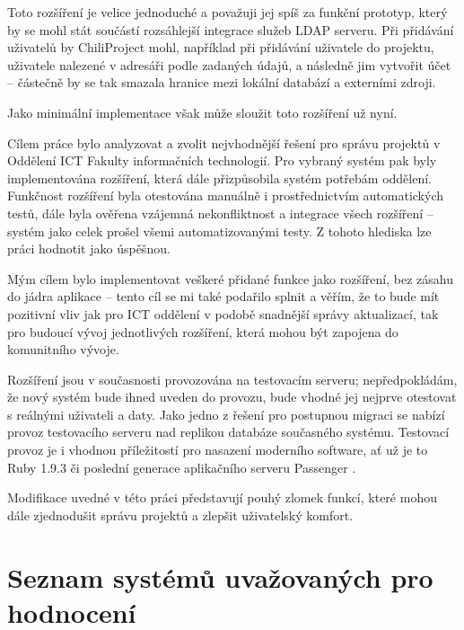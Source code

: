 \documentclass[thesis=B,czech]{FITthesis}[2012/05/02]
\begin{document}
Toto rozšíření je velice jednoduché a považuji jej spíš za funkční
prototyp, který by se mohl stát součástí rozsáhlejší integrace služeb
LDAP serveru. Při přidávání uživatelů by ChiliProject mohl, například
při přidávání uživatele do projektu,  uživatele nalezené
v adresáři podle zadaných údajů, a následně jim vytvořit účet -- částečně
by se tak smazala hranice mezi lokální databází a externími zdroji.

Jako minimální implementace však může sloužit toto rozšíření už nyní.

\begin{conclusion}

Cílem práce bylo analyzovat a zvolit nejvhodnější řešení pro správu projektů v Oddělení ICT Fakulty informačních technologií. Pro vybraný systém pak byly implementována rozšíření, která dále přizpůsobila systém potřebám oddělení. Funkčnost rozšíření byla otestována manuálně i prostřednictvím automatických testů, dále byla ověřena vzájemná nekonfliktnost a integrace všech rozšíření -- systém jako celek prošel všemi automatizovanými testy. Z tohoto hlediska lze práci hodnotit jako úspěšnou.

Mým cílem bylo implementovat veškeré přidané funkce jako rozšíření, bez zásahu do jádra aplikace -- tento cíl se mi také podařilo splnit a věřím, že to bude mít pozitivní vliv jak pro \gls{ICT} oddělení v podobě snadnější správy aktualizací, tak pro budoucí vývoj jednotlivých rozšíření, která mohou být zapojena do komunitního vývoje.

Rozšíření jsou v současnosti provozována na testovacím serveru; nepředpokládám, že nový systém bude ihned uveden do provozu, bude vhodné jej nejprve otestovat s reálnými uživateli a daty. Jako jedno z řešení pro postupnou migraci se nabízí provoz testovacího serveru nad replikou databáze současného systému. Testovací provoz je i vhodnou příležitostí pro nasazení moderního software, ať už je to Ruby 1.9.3 či poslední generace aplikačního serveru Passenger \citep{Passenger32}.

Modifikace uvedné v této práci představují pouhý zlomek funkcí, které mohou dále zjednodušit správu projektů a zlepšit uživatelský komfort.

\end{conclusion}




\appendix

\glsaddall
\printglossaries

\chapter{Seznam systémů uvažovaných pro hodnocení}
\label{chap:seznampm}
\end{document}
